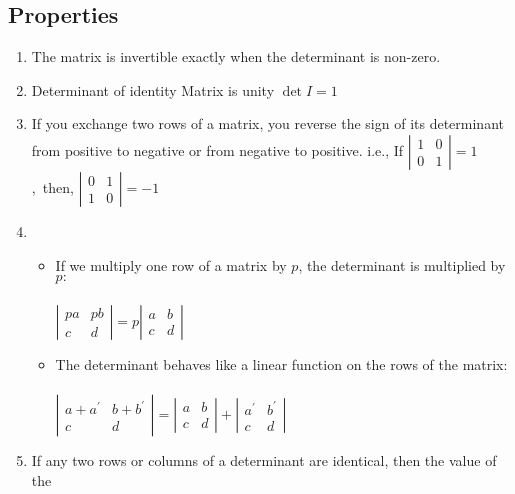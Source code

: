 \subsection{Properties}
\begin{enumerate}
	\item The matrix is invertible exactly when the determinant is non-zero.
	\item Determinant of identity Matrix is unity $\operatorname{det} I=1$
	\item If you exchange two rows of a matrix, you reverse the sign of its determinant from positive to negative or from negative to positive.
	i.e., If $\left|\begin{array}{ll}
	1 & 0 \\
	0 & 1
	\end{array}\right|=1$ ,\ then, $\left|\begin{array}{ll}0 & 1 \\ 1 & 0\end{array}\right|=-1$
	\item 
	\begin{itemize}
		\item If we multiply one row of a matrix by $p$, the determinant is multiplied by $p:$\\\\ $\left|\begin{array}{rr}p a & p b \\ c & d\end{array}\right|=p\left|\begin{array}{cc}a & b \\ c & d\end{array}\right|$
		\item The determinant behaves like a linear function on the rows of the
		matrix:\\\\
		$
		\left|\begin{array}{cc}
		a+a^{\prime} & b+b^{\prime} \\
		c & d
		\end{array}\right|=\left|\begin{array}{ll}
		a & b \\
		c & d
		\end{array}\right|+\left|\begin{array}{cc}
		a^{\prime} & b^{\prime} \\
		c & d
		\end{array}\right|
		$
	\end{itemize}
	\item If any two rows or columns of a determinant are identical, then the value of the

\end{enumerate}

